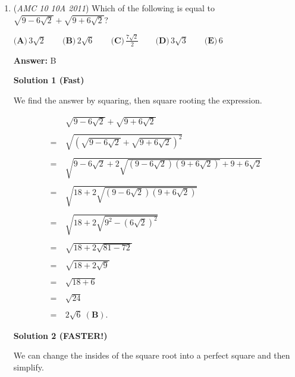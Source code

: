 \begin{enumerate}
 "And we're done."

 
            \begin{itemize}
        \item Richard Rusczyk outro*
            \end{itemize}
            


	\item (\textit{AMC 10 10A 2011}) Which of the following is equal to $\sqrt{9-6\sqrt{2}}+\sqrt{9+6\sqrt{2}}$?


 $\textbf{(A)}\,3\sqrt2 \qquad\textbf{(B)}\,2\sqrt6 \qquad\textbf{(C)}\,\frac{7\sqrt2}{2} \qquad\textbf{(D)}\,3\sqrt3 \qquad\textbf{(E)}\,6$

 \textbf{Answer: }B



\textbf{Solution 1 (Fast)}

We find the answer by squaring, then square rooting the expression.

 
 \begin{align*} &\sqrt{9-6\sqrt{2}}+\sqrt{9+6\sqrt{2}}\\\\ = \ &\sqrt{\left(\sqrt{9-6\sqrt{2}}+\sqrt{9+6\sqrt{2}}\right)^2}\\\\ = \ &\sqrt{9-6\sqrt{2}+2\sqrt{(9-6\sqrt{2})(9+6\sqrt{2})}+9+6\sqrt{2}}\\\\ = \ &\sqrt{18+2\sqrt{(9-6\sqrt{2})(9+6\sqrt{2})}}\\\\ = \ &\sqrt{18+2\sqrt{9^2-(6\sqrt{2})^2}}\\\\ = \ &\sqrt{18+2\sqrt{81-72}}\\\\ = \ &\sqrt{18+2\sqrt{9}}\\\\ = \ &\sqrt{18+6}\\\\= \ &\sqrt{24}\\\\ = \ &\boxed{2\sqrt{6} \ \mathbf{(B)}}. \end{align*}





\textbf{Solution 2 (FASTER!)}

We can change the insides of the square root into a perfect square and then simplify. 


\end{enumerate}
